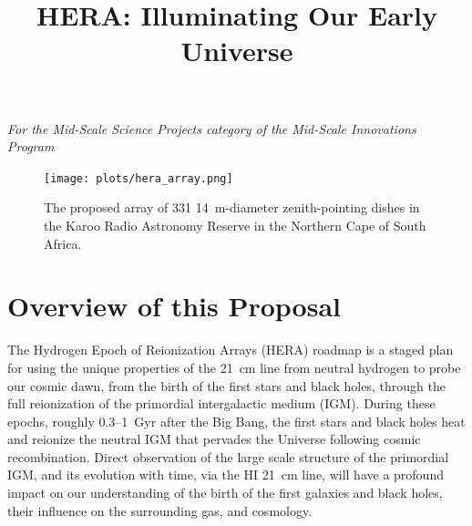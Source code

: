 \documentclass[preprint]{aastex}
\def\HI{{H{\small I }}}
\begin{document}
\title{HERA: Illuminating Our Early Universe}
{\it For the Mid-Scale Science Projects category of the Mid-Scale
Innovations Program}

\begin{figure}[H]\centering
\texttt{[image: plots/hera\_array.png]}
\caption{\small
The proposed array of 331 14~m-diameter zenith-pointing dishes in the Karoo Radio Astronomy Reserve
in the Northern Cape of South Africa.
}\label{fig:hera_array} \end{figure}


\vspace{-0.4in}
\section{Overview of this Proposal} %


The Hydrogen Epoch of Reionization Arrays (HERA) roadmap is a staged
plan for using the unique properties of the 21~cm line from neutral
hydrogen to probe our cosmic dawn, from the birth of the first 
stars and black holes, through the full reionization of the primordial
intergalactic medium (IGM). 
During these epochs, roughly 0.3--1~Gyr after the Big Bang, the
first stars and black holes heat and reionize the neutral
IGM that pervades the Universe following cosmic
recombination. Direct observation of the large scale structure of the primordial
IGM, and its evolution with time, via the \HI 21~cm line, will
have a profound impact on our understanding of the birth of the first
galaxies and black holes, their influence on the surrounding gas,
and cosmology. 
\end{document}
